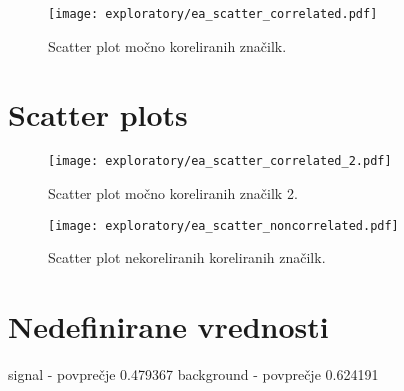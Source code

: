 \begin{figure}[ht]
	\label{scatter_corr}
	
	\texttt{[image: exploratory/ea\_scatter\_correlated.pdf]}
	
	\caption{Scatter plot močno koreliranih značilk.}
\end{figure}

\section{Scatter plots}


\begin{figure}[ht]
	\label{scatter_corr2}
	
	\texttt{[image: exploratory/ea\_scatter\_correlated\_2.pdf]}
	
	\caption{Scatter plot močno koreliranih značilk 2.}
\end{figure}

\begin{figure}[ht]
	\label{scatter_noncorr}
	
	\texttt{[image: exploratory/ea\_scatter\_noncorrelated.pdf]}
	
	\caption{Scatter plot nekoreliranih koreliranih značilk.}
\end{figure}


\section{Nedefinirane vrednosti}

signal - povprečje    0.479367
background - povprečje    0.624191

